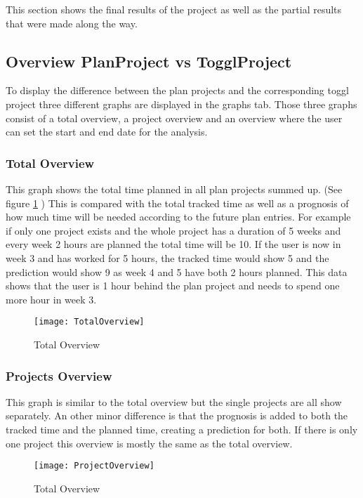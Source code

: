 
This section shows the final results of the project as well as the partial results that were made along the way.

\subsection{Overview PlanProject vs TogglProject}
To display the difference between the plan projects and the corresponding toggl project three different graphs are displayed in the graphs tab. Those three graphs consist of a total overview, a project overview and an overview where the user can set the start and end date for the analysis.
\subsubsection{Total Overview}
This graph shows the total time planned in all plan projects summed up. (See figure \ref{figure9} ) This is compared with the total tracked time as well as a prognosis of how much time will be needed according to the future plan entries. For example if only one project exists and the whole project has a duration of 5 weeks and every week 2 hours are planned the total time will be 10. If the user is now in week 3 and has worked for 5 hours, the tracked time would show 5 and the prediction would show 9 as week 4 and 5 have both 2 hours planned. This data shows that the user is 1 hour behind the plan project and needs to spend one more hour in week 3.
\begin{figure}[H]
	\centering
	\texttt{[image: TotalOverview]}
	\caption{Total Overview}
	\label{figure9}
\end{figure}

\subsubsection{Projects Overview}
This graph is similar to the total overview but the single projects are all show separately. An other minor difference is that the prognosis is added to both the tracked time and the planned time, creating a prediction for both. If there is only one project this overview is mostly the same as the total overview.
\begin{figure}[H]
	\centering
	\texttt{[image: ProjectOverview]}
	\caption{Total Overview}
	\label{figure10}
\end{figure}

